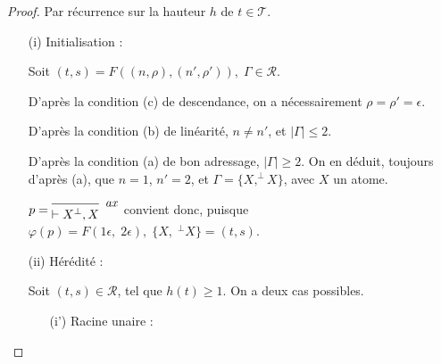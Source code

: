 \documentclass[11pt,a4paper]{article}
\theoremstyle{plain}
\theoremstyle{definition}
\theoremstyle{remark}
\newcommand*{\orth}{^\perp}
\newcommand*{\axv}[1]{\infer{0}[\ensuremath{\mathit{ax}}]{\vdash #1}}
\newcommand*{\trees}{\ensuremath{\mathcal{T}}}
\newcommand*{\representations}{\ensuremath{\mathcal{R}}}
\newcommand*{\encode}{\ensuremath{\varphi}}
\newcommand*{\height}{\ensuremath{h}}
\begin{document}
\begin{proof}
Par récurrence sur la hauteur $\height$ de $t \in \trees$.

\begin{itemize}
    \item[(i) Initialisation :]{
    Soit $(t, s) = F((n, \rho), (n', \rho')), \; \Gamma \in \representations$.

    D'après la condition (c) de descendance, on a nécessairement $\rho = \rho' = \epsilon$.

    D'après la condition (b) de linéarité, $n \neq n'$, et $| \Gamma | \leq 2$.

    D'après la condition (a) de bon adressage, $| \Gamma | \geq 2 $. On en déduit, toujours d'après (a), que $n = 1$, $n' = 2$, et $ \Gamma = \{ X, \orth{X} \}$, avec $X$ un atome.

    $p = \begin{prooftree}
            \axv{X\orth, X}
        \end{prooftree}$ convient donc, puisque $\encode \left( p \right) = F(1 \epsilon, \; 2 \epsilon), \; \{ X, \; \orth{X} \} = (t,s)$.
    }

    \item[(ii) Hérédité :]{
    Soit $(t, s) \in \representations$, tel que $\height \left( t \right) \geq 1$. On a deux cas possibles.

    \begin{itemize}
        \item[(i') Racine unaire :]
    \end{itemize}
    }
\end{itemize}
\end{proof}
\end{document}
